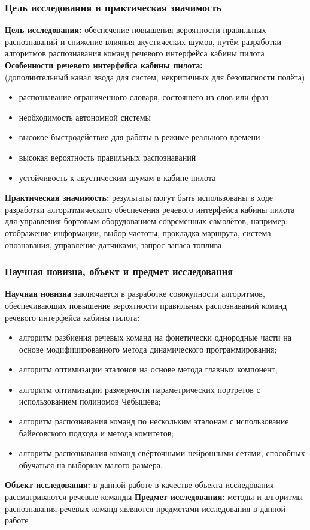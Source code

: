 \begin{frame}
\frametitle{\normalsize Цель исследования и практическая значимость}
\footnotesize
\vfill
\textbf{Цель исследования:}
обеспечение повышения вероятности правильных распознаваний и снижение влияния акустических шумов, путём разработки алгоритмов распознавания команд речевого интерфейса кабины пилота
\vfill
\textbf{Особенности речевого интерфейса кабины пилота:}
\\
{\scriptsize
(дополнительный канал ввода для систем, некритичных для безопасности полёта)
}
\begin{itemize}
	\setlength\topsep{0pt}
	\setlength\partopsep{0pt}
	\item распознавание ограниченного словаря, состоящего из слов или фраз
	\item необходимость автономной системы
	\item высокое быстродействие для работы в режиме реального времени
	\item высокая вероятность правильных распознаваний
	\item устойчивость к акустическим шумам в кабине пилота
\end{itemize}
\vfill
\textbf{Практическая значимость:} результаты могут быть использованы в ходе разработки алгоритмического обеспечения речевого интерфейса кабины пилота для управления бортовым оборудованием современных самолётов, \underline{например}: отображение информации, выбор частоты, прокладка маршрута, система опознавания, управление датчиками, запрос запаса топлива
\vfill
\end{frame}

\begin{frame}
\frametitle{\normalsize Научная новизна, объект и предмет исследования}
\footnotesize
\vfill
\textbf{Научная новизна} заключается в разработке совокупности алгоритмов, обеспечивающих повышение вероятности правильных распознаваний команд речевого интерфейса кабины пилота:
\vfill
\begin{itemize}
	\scriptsize
	\item алгоритм разбиения речевых команд на фонетически однородные части на основе модифицированного метода динамического программирования;
	\item алгоритм оптимизации эталонов на основе метода главных компонент;
	\item алгоритм оптимизации размерности параметрических портретов с использованием полиномов Чебышёва;
	\item алгоритм распознавания команд по нескольким эталонам с использование байесовского подхода и метода комитетов;
	\item алгоритм распознавания команд свёрточными нейронными сетями, способных обучаться на выборках малого размера.
\end{itemize}
\vfill
\textbf{Объект исследования:} в данной работе в качестве объекта исследования рассматриваются речевые команды
\vfill
\textbf{Предмет исследования:} методы и алгоритмы распознавания речевых команд являются предметами исследования в данной работе
\vfill
\end{frame}

